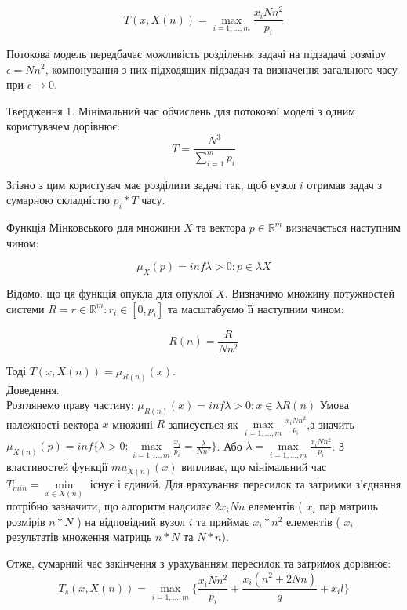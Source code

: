 \begin{equation}
	\label{eq:total_time_general}
	T(x,X(n)) = \max\limits_{i=1,\ldots,m}{\frac{x_i N n^2}{p_i}}
\end{equation}

Потокова модель передбачає можливість розділення задачі на підзадачі розміру $\epsilon = N n^2$, компонування з них підходящих підзадач та визначення загального часу при  $\epsilon \longrightarrow 0$.

Твердження 1.
Мінімальний час обчислень для потокової моделі з одним користувачем дорівнює:
\begin{equation}
	\label{eq:lema1}
	T = \frac{N^{3}}{\sum_{i=1}^{m}p_i}
\end{equation}

Згізно з цим користувач має розділити задачі так, щоб вузол $i$ отримав задач з сумарною складністю $p_i*T$ часу.

Функція Мінковського для множини $X$ та вектора $p \in \mathbb{R}^m$ визначається наступним чином:

\begin{equation}
	\mu_X(p) = inf {\lambda > 0 : p \in \lambda X}
\end{equation}

Відомо, що ця функція опукла для опуклої $X$.
Визначимо множину потужностей системи $R = {r \in \mathbb{R}^m : r_i \in [0, p_i]}$ та масштабуємо її наступним чином:

\begin{equation}
	R(n) = \frac{R}{Nn^2}
\end{equation}

Тоді $ T(x, X(n)) = \mu_{R(n)}(x) $.
\\
Доведення.
\\
Розглянемо праву частину: $\mu_{R(n)}(x) = inf {\lambda > 0 : x \in \lambda R(n)}$ Умова належності вектора $x$ множині $R$ записується як $\max\limits_{i=1,\ldots,m} \frac{x_i Nn^2}{p_i}$,а значить $\mu_{X(n)}(p) = inf \big\{ \lambda > 0 : \max\limits_{i=1,\ldots,m} \frac{x_i}{p_i} = \frac{\lambda}{Nn^2} \big\}$. Або $\lambda = \max\limits_{i=1,\ldots,m} \frac{x_i Nn^2}{p_i}$. З властивостей функції $mu_{X(n)}(x)$ випливає, що мінімальний час $T_{min} = \min\limits_{x \in X(n)} $ існує і єдиний. Для врахування пересилок та затримки з'єднання потрібно зазначити, що алгоритм надсилає $2x_iNn$ елементів ( $x_i$ пар матриць розмірів $n*N$ ) на відповідний вузол $i$ та приймає $x_i*n^2$ елементів ( $x_i$ результатів множення матриць $n*N$ та $N*n$).

Отже, сумарний час закінчення з урахуванням пересилок та затримок дорівнює:
\begin{equation}
	\label{eq:main_time}
	T_s(x,X(n)) = \max\limits_{i=1,\ldots,m} \bigg\{ \frac{x_i N n^2}{p_i} + \frac{x_i (n^2 + 2 N n )}{q} + x_i l \bigg\}
\end{equation}

